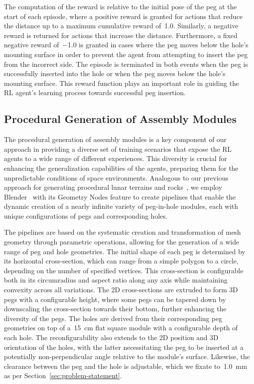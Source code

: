 The computation of the reward is relative to the initial pose of the peg at the start of each episode, where a positive reward is granted for actions that reduce the distance up to a maximum cumulative reward of~1.0. Similarly, a negative reward is returned for actions that increase the distance. Furthermore, a fixed negative reward of~\(-\)1.0 is granted in cases where the peg moves below the hole's mounting surface in order to prevent the agent from attempting to insert the peg from the incorrect side. The episode is terminated in both events when the peg is successfully inserted into the hole or when the peg moves below the hole's mounting surface. This reward function plays an important role in guiding the RL agent's learning process towards successful peg insertion.


\subsection{Procedural Generation of Assembly Modules}\label{ssec:procedural-generation-of-assembly-modules}

The procedural generation of assembly modules is a key component of our approach in providing a diverse set of training scenarios that expose the RL agents to a wide range of different experiences. This diversity is crucial for enhancing the generalization capabilities of the agents, preparing them for the unpredictable conditions of space environments. Analogous to our previous approach for generating procedural lunar terrains and rocks~\cite{orsula2022learning}, we employ Blender~\cite{blender} with its Geometry Nodes feature to create pipelines that enable the dynamic creation of a nearly infinite variety of peg-in-hole modules, each with unique configurations of pegs and corresponding holes.

The pipelines are based on the systematic creation and transformation of mesh geometry through parametric operations, allowing for the generation of a wide range of peg and hole geometries. The initial shape of each peg is determined by its horizontal cross-section, which can range from a simple polygon to a circle, depending on the number of specified vertices. This cross-section is configurable both in its circumradius and aspect ratio along any axis while maintaining convexity across all variations. The 2D cross-sections are extruded to form 3D pegs with a configurable height, where some pegs can be tapered down by downscaling the cross-section towards their bottom, further enhancing the diversity of the pegs. The holes are derived from their corresponding peg geometries on top of a~15~cm flat square module with a configurable depth of each hole. The reconfigurability also extends to the 2D position and 3D orientation of the holes, with the latter necessitating the peg to be inserted at a potentially non-perpendicular angle relative to the module's surface. Likewise, the clearance between the peg and the hole is adjustable, which we fixate to~1.0~mm as per Section~\ref{sec:problem-statement}.

